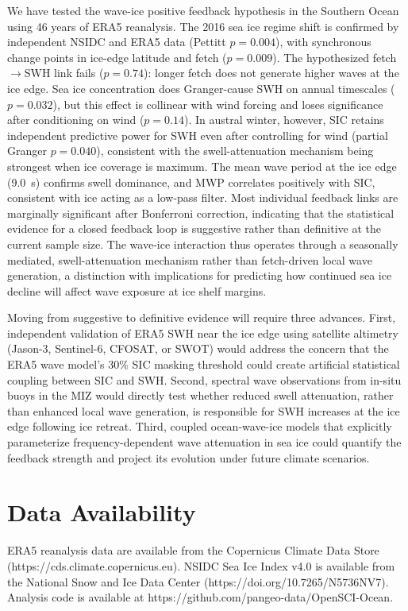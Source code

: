 \documentclass[11pt]{article}
\begin{document}
We have tested the wave-ice positive feedback hypothesis in the Southern Ocean using 46 years of ERA5 reanalysis. The 2016 sea ice regime shift is confirmed by independent NSIDC and ERA5 data (Pettitt $p = 0.004$), with synchronous change points in ice-edge latitude and fetch ($p = 0.009$). The hypothesized fetch$\to$SWH link fails ($p = 0.74$): longer fetch does not generate higher waves at the ice edge. Sea ice concentration does Granger-cause SWH on annual timescales ($p = 0.032$), but this effect is collinear with wind forcing and loses significance after conditioning on wind ($p = 0.14$). In austral winter, however, SIC retains independent predictive power for SWH even after controlling for wind (partial Granger $p = 0.040$), consistent with the swell-attenuation mechanism being strongest when ice coverage is maximum. The mean wave period at the ice edge (9.0~s) confirms swell dominance, and MWP correlates positively with SIC, consistent with ice acting as a low-pass filter. Most individual feedback links are marginally significant after Bonferroni correction, indicating that the statistical evidence for a closed feedback loop is suggestive rather than definitive at the current sample size. The wave-ice interaction thus operates through a seasonally mediated, swell-attenuation mechanism rather than fetch-driven local wave generation, a distinction with implications for predicting how continued sea ice decline will affect wave exposure at ice shelf margins.

Moving from suggestive to definitive evidence will require three advances. First, independent validation of ERA5 SWH near the ice edge using satellite altimetry (Jason-3, Sentinel-6, CFOSAT, or SWOT) would address the concern that the ERA5 wave model's 30\% SIC masking threshold could create artificial statistical coupling between SIC and SWH. Second, spectral wave observations from in-situ buoys in the MIZ\cite{Thomson2018,Doble2013} would directly test whether reduced swell attenuation, rather than enhanced local wave generation, is responsible for SWH increases at the ice edge following ice retreat. Third, coupled ocean-wave-ice models that explicitly parameterize frequency-dependent wave attenuation in sea ice\cite{Bennetts2022} could quantify the feedback strength and project its evolution under future climate scenarios\cite{Roach2020}.

\section*{Data Availability}

ERA5 reanalysis data are available from the Copernicus Climate Data Store (https://cds.climate.copernicus.eu). NSIDC Sea Ice Index v4.0 is available from the National Snow and Ice Data Center (https://doi.org/10.7265/N5736NV7). Analysis code is available at https://github.com/pangeo-data/OpenSCI-Ocean.



\end{document}
